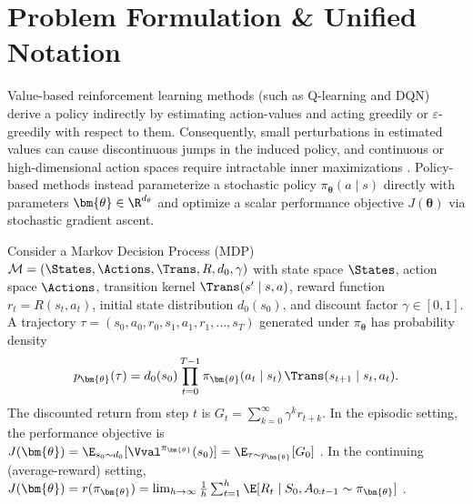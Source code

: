 \documentclass[../../../../master.tex]{subfiles}
\begin{document}
\begingroup
\sloppy


\section{Problem Formulation \& Unified Notation}\label{sec:pg:formulation}

Value-based reinforcement learning methods (such as Q-learning and DQN) derive a policy indirectly by estimating action-values and acting greedily or $\varepsilon$-greedily with respect to them. Consequently, small perturbations in estimated values can cause discontinuous jumps in the induced policy, and continuous or high-dimensional action spaces require intractable inner maximizations  . Policy-based methods instead parameterize a stochastic policy $\pi_{\bm{\theta}}(a \mid s)$ directly with parameters $\bm{\theta} \in \R^{d_\theta}$ and optimize a scalar performance objective $J(\bm{\theta})$ via stochastic gradient ascent.

Consider a Markov Decision Process (MDP) $\mathcal{M} = (\States, \Actions, \Trans, R, d_0, \gamma)$ with state space $\States$, action space $\Actions$, transition kernel $\Trans(s' \mid s, a)$, reward function $r_t = R(s_t, a_t)$, initial state distribution $d_0(s_0)$, and discount factor $\gamma \in [0, 1]$. A trajectory $\tau = (s_0, a_0, r_0, s_1, a_1, r_1, \dots, s_T)$ generated under $\pi_{\bm{\theta}}$ has probability density
\begin{equation}\label{eq:pg:traj_prob}
  p_{\bm{\theta}}(\tau) = d_0(s_0) \prod_{t=0}^{T-1} \pi_{\bm{\theta}}(a_t \mid s_t)\, \Trans(s_{t+1} \mid s_t, a_t).
\end{equation}
The discounted return from step $t$ is $G_t = \sum_{k=0}^{\infty} \gamma^k r_{t+k}$. In the episodic setting, the performance objective is $J(\bm{\theta}) = \E_{s_0 \sim d_0}[\Vval^{\pi_{\bm{\theta}}}(s_0)] = \E_{\tau \sim p_{\bm{\theta}}}[G_0]$ \allowbreak{}. In the continuing (average-reward) setting, $J(\bm{\theta}) = r(\pi_{\bm{\theta}}) = \lim_{h \to \infty} \frac{1}{h} \sum_{t=1}^h \E[R_t \mid S_0, A_{0:t-1} \sim \pi_{\bm{\theta}}]$ \allowbreak{}.
\end{document}
